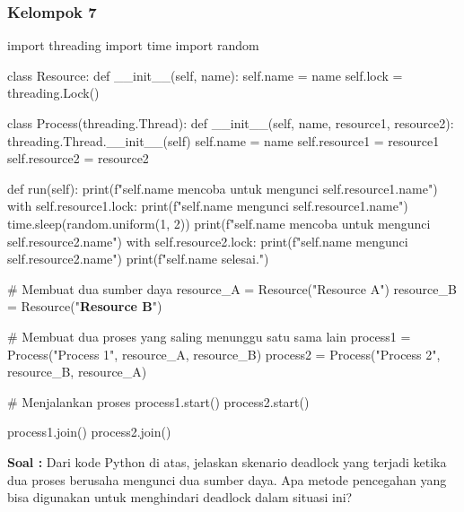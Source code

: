 \documentclass[12pt]{article}
\begin{document}
\subsubsection{Kelompok 7}
\begin{python}
import threading
import time
import random

class Resource:
    def __init__(self, name):
        self.name = name
        self.lock = threading.Lock()

class Process(threading.Thread):
    def __init__(self, name, resource1, resource2):
        threading.Thread.__init__(self)
        self.name = name
        self.resource1 = resource1
        self.resource2 = resource2

    def run(self):
        print(f"{self.name} mencoba untuk mengunci {self.resource1.name}")
        with self.resource1.lock:
            print(f"{self.name} mengunci {self.resource1.name}")
            time.sleep(random.uniform(1, 2))
            print(f"{self.name} mencoba untuk mengunci {self.resource2.name}")
            with self.resource2.lock:
                print(f"{self.name} mengunci {self.resource2.name}")
        print(f"{self.name} selesai.")

# Membuat dua sumber daya
resource_A = Resource("Resource A")
resource_B = Resource("\textbf{Resource B}")

# Membuat dua proses yang saling menunggu satu sama lain
process1 = Process("Process 1", resource_A, resource_B)
process2 = Process("Process 2", resource_B, resource_A)

# Menjalankan proses
process1.start()
process2.start()

process1.join()
process2.join()
\end{python}

\textbf{Soal : }
Dari kode Python di atas, jelaskan skenario deadlock yang terjadi ketika dua proses berusaha mengunci dua sumber daya. Apa metode pencegahan yang bisa digunakan untuk menghindari deadlock dalam situasi ini? \\
\end{document}
